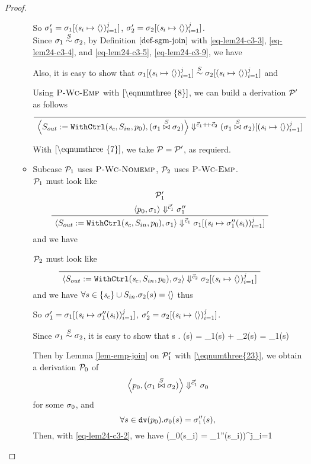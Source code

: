 \begin{proof}
\begin{itemize}
\begin{itemize}
 \def\sgmbe#1{\sgm_#1[\j{\s_i \|-> \emptyv}]}
    	
    	So $\sgm_1' = \sgmbe{1}$, $\sgm_2' = \sgmbe{2}$. \\
    	
 	Since $\sigma_1 \stackrel{S}{\sim} \sigma_2$, by Definition $\ref{def-sgm-join}$ with \eqref{eq-lem24-c3-3}, \eqref{eq-lem24-c3-4}, and  \eqref{eq-lem24-c3-5}, \eqref{eq-lem24-c3-9}, we have    		
   		
   		Also, it is easy to show that $\sgmbe1 \~{\S} \sgmbe2$ and 
   		\eq{\eqnumthree{7}}{
   			\sgmbe1 \x{\S} \sgmbe2 = \sgmx[\j{\s_i \|-> \emptyv}]
   		}
   	
    Using $\textsc{P-Wc-Emp}$ with $\eqref{\eqnumthree{8}}$, we can build a derivation $\mathcal{P}'$ as follows
   		$$\PT{
   			\Axiom{\seval{\casethree}{\sgmx}{\cc}{\sgmx[\j{\s_i \|-> \emptyv}]}}
   		}$$
   	
   	With $\eqref{\eqnumthree{7}}$, we take $\mathcal{P} = \mathcal{P}'$, as requierd.
   
   	\item Subcase $\mathcal{P}_1$ uses  $\textsc{P-Wc-Nomemp}$, $\mathcal{P}_2$ uses $\textsc{P-Wc-Emp}$. \\
  \def\sgmbpp#1{\sgm_{#1}[\j{\s_i \|-> \sgm_{#1}''(\s_i)}]}   	
   	$\mathcal{P}_1$ must look like
   	$$\PT{
   			\UCN{\MP_1'}{\seval{p_0}{\sgm_1}{\c_1'}{\sgm_1''}}
   			\UC{\seval{\casethree}{\sgm_1}{\c_1}{\sgmbpp1}}
   	}$$
    and we have 
   	
   	$\mathcal{P}_2$ must look like	
   	$$\PT{
   		\Axiom{\seval{\casethree}{\sgm_2}{\c_2}{\sgmbe{2}}}
   	}$$
   	and we have  
   	$\forall s \in \{\mathit{s}_c\} \cup S_{in}. \sigma_2(s) = \langle \rangle$
   thus
 	
	So $\sgm_1' = \sgmbpp{1}$, $\sgm_2' = \sgmbe{2}$.
	
	Since $\sigma_1 \stackrel{S}{\sim} \sigma_2$, it is easy to show that 
	 { \forall s \in {}. \sgmx(s) = \sgm_1(s) {\++} \sgm_2(s) = \sgm_1(s)}
	
	Then by Lemma \ref{lem-emp-join} on  $\mathcal{P}_1'$ with \eqref{\eqnumthree{23}}, we obtain a derivation $\mathcal{P}_0$
    of 
    $$\left\langle p_0,(\sigma_1 \stackrel{S}{\bowtie} \sigma_2) \right\rangle \Downarrow^{\vec c_1'} \sigma_0$$ for some $\sigma_0$, and 
    $$\forall s \in \mathtt{dv}(p_0). \sigma_0(s) = \sigma_1''(s), $$
    Then, with \eqref{eq-lem24-c3-2}, we have
     {(\sgm_0(s_i) = \sgm_1''(s_i))^j_{i=1}}
    

\end{itemize}
\end{itemize}
\end{proof}
